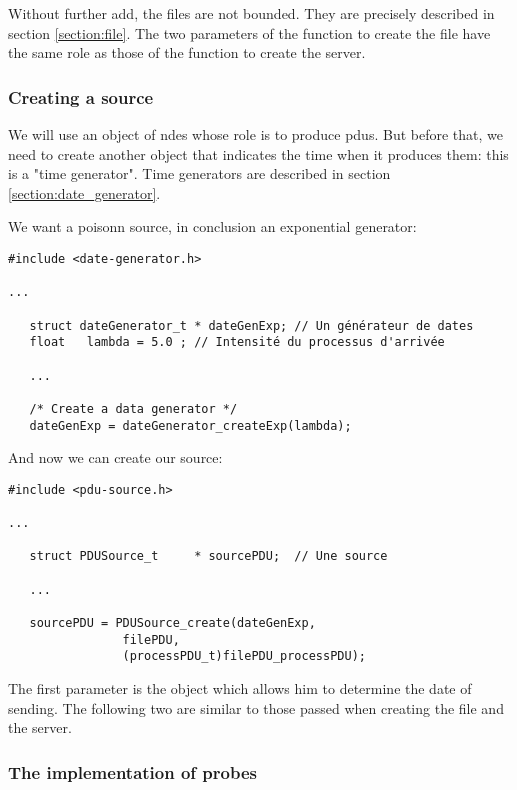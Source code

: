    Without further add, the files are not bounded. They
are precisely described in section \ref{section:file}. The
two parameters of the function to create the file have the same role as those of the function to create the server.
 
%
\subsubsection{Creating a source}

   We will use an object of {\sc ndes} whose role is to produce {\sc pdu}s. But before that, we need to create another object that indicates the time when it produces them: this is a "time generator". Time generators are described in section \ref{section:date_generator}.

    We want a poisonn source, in conclusion an exponential generator:

\begin{verbatim}
#include <date-generator.h>

...

   struct dateGenerator_t * dateGenExp; // Un générateur de dates
   float   lambda = 5.0 ; // Intensité du processus d'arrivée

   ...

   /* Create a data generator */
   dateGenExp = dateGenerator_createExp(lambda);
\end{verbatim}

   And now we can create our source:

\begin{verbatim}
#include <pdu-source.h>

...

   struct PDUSource_t     * sourcePDU;  // Une source

   ...

   sourcePDU = PDUSource_create(dateGenExp, 
				filePDU,
				(processPDU_t)filePDU_processPDU);
\end{verbatim}
  
   The first parameter is the object which allows him to determine
the date of sending. The following two are similar to those passed
when creating the file and the server.
   
%
\subsubsection{The implementation of probes}

